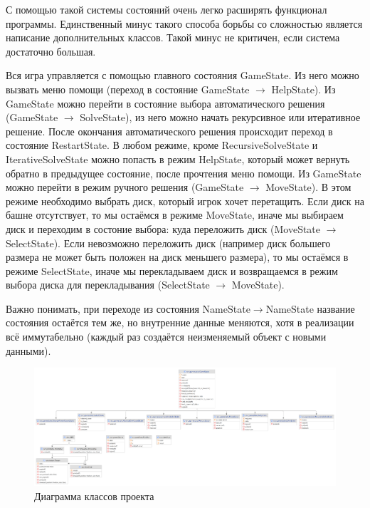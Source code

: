 С помощью такой системы состояний очень легко расширять функционал программы.
Единственный минус такого способа борьбы со сложностью является написание
дополнительных классов. Такой минус не критичен, если система достаточно
большая.

Вся игра управляется с помощью главного состояния GameState. Из него можно
вызвать меню помощи (переход в состояние GameState $\rightarrow$ HelpState). Из
GameState можно перейти в состояние выбора автоматического решения (GameState
$\rightarrow$ SolveState), из него можно начать рекурсивное или итеративное
решение. После окончания автоматического решения происходит переход в состояние
RestartState. В любом режиме, кроме RecursiveSolveState и IterativeSolveState
можно попасть в режим HelpState, который может вернуть обратно в предыдущее
состояние, после прочтения меню помощи. Из GameState можно перейти в режим
ручного решения (GameState $\rightarrow$ MoveState). В этом режиме необходимо
выбрать диск, который игрок хочет перетащить. Если диск на башне отсутствует,
то мы остаёмся в режиме MoveState, иначе мы выбираем диск и переходим в
состоние выбора: куда переложить диск (MoveState $\rightarrow$ SelectState).
Если невозможно переложить диск (например диск большего размера не может быть
положен на диск меньшего размера), то мы остаёмся в режиме SelectState, иначе
мы перекладываем диск и возвращаемся в режим выбора диска для перекладывания
(SelectState $\rightarrow$ MoveState).

Важно понимать, при переходе из
состояния NameState$\rightarrow$NameState название состояния остаётся тем же,
но внутренние данные меняются, хотя в реализации всё иммутабельно (каждый раз
создаётся неизменяемый объект с новыми данными).

\begin{figure}[H]
	\begin{center}
		\includegraphics[width=\textwidth]{images/diagram.png}
		\caption{Диаграмма классов проекта}
	\end{center}
\end{figure}


